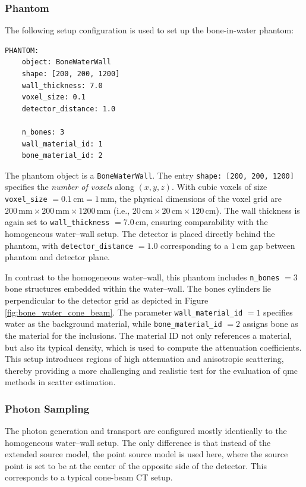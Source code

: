 \subsubsection*{Phantom}
The following setup configuration is used to set up the bone-in-water phantom:
\begin{lstlisting}
PHANTOM:
    object: BoneWaterWall
    shape: [200, 200, 1200]
    wall_thickness: 7.0
    voxel_size: 0.1
    detector_distance: 1.0

    n_bones: 3
    wall_material_id: 1
    bone_material_id: 2
\end{lstlisting}

The phantom object is a \texttt{BoneWaterWall}. The entry \texttt{shape: [200,
200, 1200]} specifies the \emph{number of voxels} along $(x,y,z)$. With cubic
voxels of size \texttt{voxel\_size} $=0.1\,\mathrm{cm}=1\,\mathrm{mm}$, the
physical dimensions of the voxel grid are $200\,\mathrm{mm} \times
200\,\mathrm{mm} \times 1200\,\mathrm{mm}$ (i.e., $20\,\mathrm{cm} \times
20\,\mathrm{cm} \times 120\,\mathrm{cm}$). The wall thickness is again set to
\texttt{wall\_thickness} $=7.0\,\mathrm{cm}$, ensuring comparability with the
homogeneous water--wall setup. The detector is placed directly behind the
phantom, with \texttt{detector\_distance} $=1.0$ corresponding to a
$1\,\mathrm{cm}$ gap between phantom and detector plane.

In contrast to the homogeneous water--wall, this phantom includes
\texttt{n\_bones} $=3$ bone structures embedded within the water--wall. The bones
cylinders lie perpendicular to the detector grid as depicted in Figure
\ref{fig:bone_water_cone_beam}. The parameter \texttt{wall\_material\_id} $=1$
specifies water as the background material, while \texttt{bone\_material\_id}
$=2$ assigns bone as the material for the inclusions. The material ID not
only references a material, but also its typical density, which
is used to compute the attenuation coefficients. This setup introduces regions
of high attenuation and anisotropic scattering, thereby providing a more
challenging and realistic test for the evaluation of \ac{qmc} methods in scatter
estimation.

\subsubsection*{Photon Sampling}
The photon generation and transport are configured mostly identically to the
homogeneous water--wall setup. The only difference is that instead of the
extended source model, the point source model is used here, where the source
point is set to be at the center of the opposite side of the detector. This
corresponds to a typical cone-beam CT setup.

